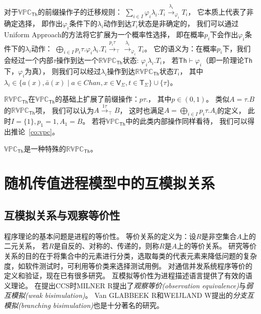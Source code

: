 对于$\mathbb{VPC}_{\mathsf{Th}}$的前缀操作子的迁移规则：
$\sum_{i\in I} \varphi_i \lambda_i. T_i\stackrel{\lambda_i}{\rightarrow}_{\varphi_i} T_i$，
它本质上代表了非确定选择，
即作出$\varphi_i$条件下的$\lambda_i$动作到达$T_i$状态是非确定的，
我们可以通过Uniform Approach的方法将它扩展为一个概率性选择，
即在概率$p_i$下会作出$\varphi_i$条件下的$\lambda_i$动作：
$\bigoplus_{i\in I} p_i\tau.\varphi_i \lambda_i. T_i\stackrel{p_i\tau}{\rightarrow}_{\top}\stackrel{\lambda_i}{\rightarrow}_{\varphi_i} T_i$。
它的语义为：在概率$p_i$下，我们会经过一个内部$\tau$操作到达一个$\mathbb{RVPC}_{\mathsf{Th}}$状态:
$\varphi_i\lambda_i.T_i$，
若$\mathsf{Th}\vdash \varphi_i$（即一阶理论$\mathsf{Th}$下，$\varphi_i$为真），
则我们可以经过$\lambda_i$操作到达$\mathbb{RVPC}_{\mathsf{Th}}$状态$T_i$， 
其中$\lambda_i \in \{a(x),\bar{a}(x)\mid a\in Chan, x\in \mathsf{V}_\Sigma, t\in \mathsf{T}_\Sigma\}\cup \{\tau\}$。

$\mathbb{RVPC}_{\mathsf{Th}}$在$\mathbb{VPC}_{\mathsf{Th}}$的基础上扩展了前缀操作：$p\tau.$，
其中$p\in (0,1)$。
类似$A=\tau.B$的$\mathbb{RVPC}_{\mathsf{Th}}$项，
我们可以认为$A\stackrel{1\tau}{\rightarrow}_{\top} B$，
这时也满足$A=\bigoplus_{i\in I} p_i\tau.A_i$的定义，
此时$I=\{1\},p_1=1,A_1=B$。
若将$\mathbb{VPC}_{\mathsf{Th}}$中的此类内部操作同样看待，
我们可以得出推论~\ref{co:vpc}。
\begin{corollary}\label{co:vpc}
   $\mathbb{VPC}_{\mathsf{Th}}$是一种特殊的$\mathbb{RVPC}_{\mathsf{Th}}$。
\end{corollary}

\section{随机传值进程模型中的互模拟关系}

\subsection{互模拟关系与观察等价性}\label{ch:bisimulation}

   程序理论的基本问题是进程的等价性。
   等价关系的定义为：设$R$是非空集合$A$上的二元关系，
   若$R$是自反的、对称的、传递的，则称$R$是$A$上的等价关系。
   研究等价关系的目的在于将集合中的元素进行分类，选取每类的代表元素来降低问题的复杂度，如软件测试时，可利用等价类来选择测试用例\cite{Equiv}。
   对通信并发系统程序等价的定义和验证，现在已有很多研究。
   互模拟等价性为进程描述语言提供了有效的语义理论。
   在提出CCS时MILNER R提出了\textit{观察等价(observation equivalence)}与\textit{弱互模拟(weak bisimulation)}\cite{Milner_CCS}。
   Van GLABBEEK R和WEIJLAND W提出的\textit{分支互模拟(branching bisimulation)}\cite{Branching_1, Branching_2}也是十分著名的研究。

